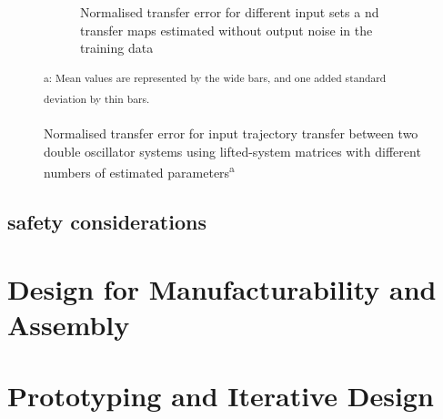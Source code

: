 \begin{figure}[h!]
\begin{subfigure}[t]{1\textwidth}
		\caption{Normalised transfer error for different input sets a nd transfer maps estimated without output noise in the training data}
		\label{subfig:sim1_lsd_results_freq}
	\end{subfigure}
	\caption[Double Oscillator -- Transfer Error (Transfer Matrix)]
	{Normalised transfer error for input trajectory transfer between two double oscillator systems using lifted-system matrices with different numbers of estimated parameters\textsuperscript{\textcolor{note_color}{a}}}
	\raggedright\small\textsuperscript{\hspace{0.132\textwidth}\textcolor{note_color}{a}: Mean values are represented by the wide bars, and one added standard deviation by thin bars.}
	\label{fig:sim1_lsd_results}
\end{figure}



\subsection{safety considerations}





\section{Design for Manufacturability and Assembly}
\section{Prototyping and Iterative Design}



